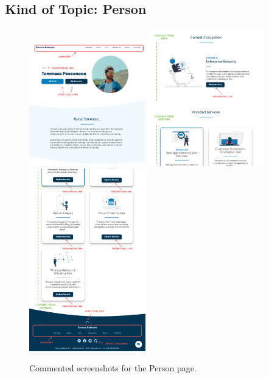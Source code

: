 \documentclass[12pt]{report}
\begin{document}
\subsection{Kind of Topic: Person}

\begin{figure}[H]
	\centering
	\includegraphics[width=0.45\textwidth]{high_fid_wireframes/person/1.png}
	\includegraphics[width=0.45\textwidth]{high_fid_wireframes/person/2.png}
	\includegraphics[width=0.45\textwidth]{high_fid_wireframes/person/3.png}
	\caption{Commented screenshots for the Person page.}
\end{figure}
\end{document}
